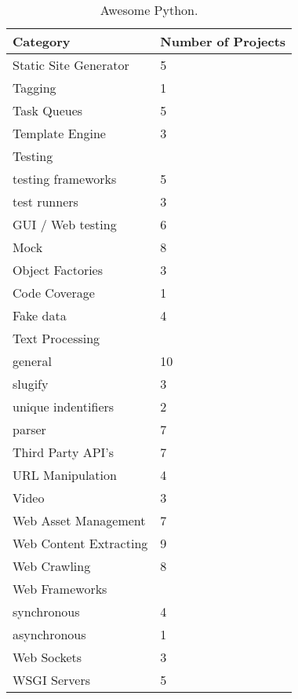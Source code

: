 \begin{table}[ht]
\centering
\begin{tabular}{ll}
\hline
\textbf{Category} & \textbf{Number of Projects}\\
\hline
Static Site Generator & 5\\
Tagging & 1\\
Task Queues & 5\\
Template Engine & 3\\
Testing & \\
testing frameworks & 5\\
test runners & 3\\
GUI / Web testing & 6\\
Mock & 8\\
Object Factories & 3\\
Code Coverage & 1\\
Fake data & 4\\
Text Processing & \\
general & 10\\
slugify & 3\\
unique indentifiers & 2\\
parser & 7\\
Third Party API’s & 7\\
URL Manipulation & 4\\
Video & 3\\
Web Asset Management & 7\\
Web Content Extracting & 9\\
Web Crawling & 8\\
Web Frameworks & \\
synchronous & 4\\
asynchronous & 1\\
Web Sockets & 3\\
WSGI Servers & 5\\
\hline
\end{tabular}
\caption[Awesome Python]{\label{table:awesome-python4}Awesome Python.}
\end{table}
